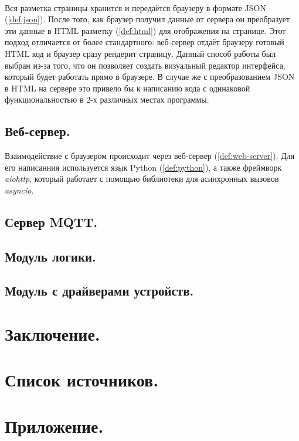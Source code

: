 ~\

\noindent Вся разметка страницы хранится и передаётся браузеру в формате JSON (\ref{def:json}). После того, как браузер
получил данные от сервера он преобразует эти данные в HTML разметку (\ref{def:html}) для отображения на странице. Этот подход
отличается от более стандартного: веб-сервер отдаёт браузеру готовый HTML код и браузер сразу рендерит страницу.
Данный способ работы был выбран из-за того, что он позволяет создать визуальный редактор интерфейса, который будет работать
прямо в браузере. В случае же с преобразованием JSON в HTML на сервере это привело бы к написанию кода с одинаковой
функциональностью в 2-х различных местах программы.

\subsection{Веб-сервер.}

Взаимодействие с браузером происходит через веб-сервер (\ref{def:web-server}). Для его написанния используется язык
Python (\ref{def:python}), а также фреймворк \textit{aiohttp}, который работает с помощью библиотеки для асинхронных вызовов
\textit{asyncio}.

\subsection{Сервер MQTT.}

\subsection{Модуль логики.}

\subsection{Модуль с драйверами устройств.}

\clearpage

\section{Заключение.}

\clearpage

\section{Список источников.}

\clearpage

\section{Приложение.}
